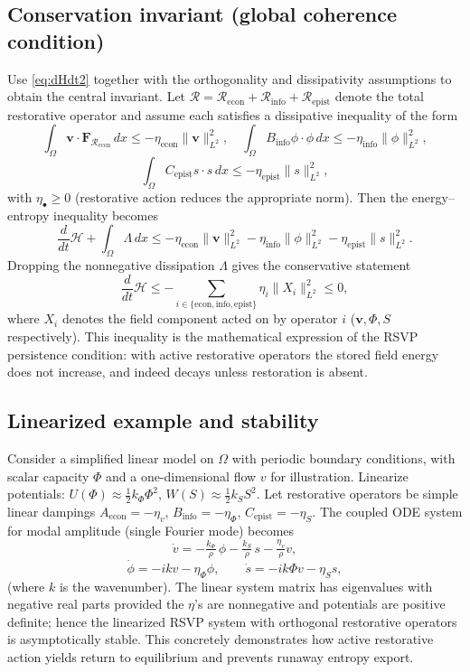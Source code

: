\documentclass[12pt]{article}
\begin{document}
\subsection{Conservation invariant (global coherence condition)}
Use \eqref{eq:dHdt2} together with the orthogonality and dissipativity assumptions to obtain the central invariant. Let $\mathcal R=\mathcal R_{\mathrm{econ}}+\mathcal R_{\mathrm{info}}+\mathcal R_{\mathrm{epist}}$ denote the total restorative operator and assume each satisfies a dissipative inequality of the form
\[
\int_{\Omega}\mathbf v\cdot\mathbf F_{\mathcal R_{\mathrm{econ}}}\,dx \le -\eta_{\mathrm{econ}}\|\mathbf v\|_{L^2}^2,\quad
\int_{\Omega}B_{\mathrm{info}}\phi\cdot\phi\,dx \le -\eta_{\mathrm{info}}\|\phi\|_{L^2}^2,
\]
\[
\int_{\Omega}C_{\mathrm{epist}} s\cdot s\,dx \le -\eta_{\mathrm{epist}}\|s\|_{L^2}^2,
\]
with $\eta_{\bullet}\ge 0$ (restorative action reduces the appropriate norm). Then the energy–entropy inequality becomes
\[
\frac{d}{dt}\mathcal H + \int_{\Omega}\Lambda\,dx \le -\eta_{\mathrm{econ}}\|\mathbf v\|_{L^2}^2 -\eta_{\mathrm{info}}\|\phi\|_{L^2}^2 -\eta_{\mathrm{epist}}\|s\|_{L^2}^2.
\]
Dropping the nonnegative dissipation $\Lambda$ gives the conservative statement
\[
\boxed{\qquad \frac{d}{dt}\mathcal H \le -\sum_{i\in\{\mathrm{econ,info,epist}\}}\eta_i\|X_i\|_{L^2}^2 \le 0,\qquad}
\]
where $X_i$ denotes the field component acted on by operator $i$ ($\mathbf v,\Phi,S$ respectively). This inequality is the mathematical expression of the RSVP persistence condition: with active restorative operators the stored field energy does not increase, and indeed decays unless restoration is absent.

\subsection{Linearized example and stability}
Consider a simplified linear model on $\Omega$ with periodic boundary conditions, with scalar capacity $\Phi$ and a one-dimensional flow $v$ for illustration. Linearize potentials: $U(\Phi)\approx \tfrac12 k_\Phi \Phi^2$, $W(S)\approx\tfrac12 k_S S^2$. Let restorative operators be simple linear dampings $A_{\mathrm{econ}}=-\eta_v$, $B_{\mathrm{info}}=-\eta_\Phi$, $C_{\mathrm{epist}}=-\eta_S$. The coupled ODE system for modal amplitude (single Fourier mode) becomes
\[
\dot v = -\tfrac{k_\Phi}{\rho}\, \phi - \tfrac{k_S}{\rho}\, s - \tfrac{\eta_v}{\rho} v,
\]
\[
\dot\phi = -i k v - \eta_\Phi \phi,\qquad
\dot s = -i k \Phi v - \eta_S s,
\]
(where $k$ is the wavenumber). The linear system matrix has eigenvalues with negative real parts provided the $\eta$'s are nonnegative and potentials are positive definite; hence the linearized RSVP system with orthogonal restorative operators is asymptotically stable. This concretely demonstrates how active restorative action yields return to equilibrium and prevents runaway entropy export.
\end{document}
